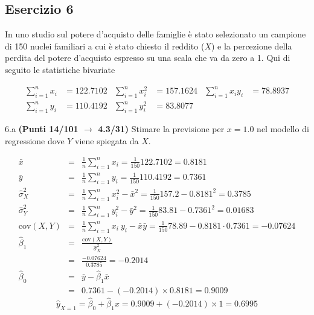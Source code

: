 \documentclass[
  11pt,
]{book}
\theoremstyle{mytheoremstyle}
\theoremstyle{mydefstyle}
\newenvironment{sol}
  {
  \begin{tcolorbox}[enhanced,breakable,arc=0.1mm,boxrule=1pt,colback=white,colframe=iblue,
  title=\bf \fontfamily{lmss}\selectfont \hspace{.5 cm} Soluzione,drop fuzzy shadow]

}{
\end{tcolorbox}
  }
\begin{document}
\subsection{Esercizio 6}\label{esercizio-6-9}

In uno studio sul potere d'acquisto delle famiglie è stato selezionato un campione di 150 nuclei familiari
a cui è stato chiesto il reddito (\(X\)) e la percezione della perdita del potere d'acquisto espresso su una scala che va da zero a 1.
Qui di seguito le statistiche bivariate

\begin{align*}
  \sum_{i=1}^n x_i &= 122.7102 &\sum_{i=1}^n x_i^2 &= 157.1624 &\sum_{i=1}^n x_i y_i &= 78.8937\\
  \sum_{i=1}^n y_i &= 110.4192 & \sum_{i=1}^n y_i^2 &= 83.8077 &
\end{align*}

6.a \textbf{(Punti 14/101 \(\rightarrow\) 4.3/31)} Stimare la previsione per \(x=1.0\) nel modello di regressione dove \(Y\) viene spiegata da \(X\).

\begin{sol}
\begin{eqnarray*}
           \bar x &=&\frac 1 n\sum_{i=1}^n x_i = \frac {1}{ 150 }  122.7102 =  0.8181 \\
           \bar y &=&\frac 1 n\sum_{i=1}^n y_i = \frac {1}{ 150 }  110.4192 =  0.7361 \\
           \hat\sigma_X^2&=&\frac 1 n\sum_{i=1}^n x_i^2-\bar x^2=\frac {1}{ 150 }  157.2  - 0.8181 ^2= 0.3785 \\
           \hat\sigma_Y^2&=&\frac 1 n\sum_{i=1}^n y_i^2-\bar y^2=\frac {1}{ 150 }  83.81  - 0.7361 ^2= 0.01683 \\
           \text{cov}(X,Y)&=&\frac 1 n\sum_{i=1}^n x_i~y_i-\bar x\bar y=\frac {1}{ 150 }  78.89 - 0.8181 \cdot 0.7361 = -0.07624 \\
           \hat\beta_1 &=& \frac{\text{cov}(X,Y)}{\hat\sigma_X^2} \\
                    &=& \frac{ -0.07624 }{ 0.3785 }  =  -0.2014 \\
           \hat\beta_0 &=& \bar y - \hat\beta_1 \bar x\\
                    &=&  0.7361 - (-0.2014) \times  0.8181 = 0.9009 
         \end{eqnarray*}\[\hat y_{X= 1 }=\hat\beta_0+\hat\beta_1 x= 0.9009 + (-0.2014) \times 1 = 0.6995 \]

\end{sol}
\end{document}
